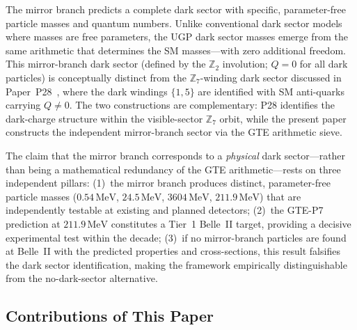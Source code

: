 \documentclass[11pt]{article}
\begin{document}
The mirror branch predicts a complete dark sector with specific, parameter-free particle
masses and quantum numbers. Unlike conventional dark sector models where masses are free
parameters, the UGP dark sector masses emerge from the same arithmetic that determines
the SM masses---with zero additional freedom.
This mirror-branch dark sector (defined by the $\mathbb{Z}_2$ involution; $Q=0$ for all dark particles) is conceptually distinct from the $\mathbb{Z}_7$-winding dark sector discussed in Paper~P28~\cite{SpivackCompUniversality}, where the dark windings $\{1,5\}$ are identified with SM anti-quarks carrying $Q \neq 0$. The two constructions are complementary: P28 identifies the dark-charge structure within the visible-sector $\mathbb{Z}_7$ orbit, while the present paper constructs the independent mirror-branch sector via the GTE arithmetic sieve.

The claim that the mirror branch corresponds to a \emph{physical} dark sector---rather
than being a mathematical redundancy of the GTE arithmetic---rests on three independent
pillars: (1)~the mirror branch produces distinct, parameter-free particle masses
($0.54\,\mathrm{MeV}$, $24.5\,\mathrm{MeV}$, $3604\,\mathrm{MeV}$,
$211.9\,\mathrm{MeV}$) that are independently testable at existing and planned
detectors; (2)~the GTE-P7 prediction at $211.9\,\mathrm{MeV}$ constitutes a Tier~1
Belle~II target, providing a decisive experimental test within the decade; (3)~if
no mirror-branch particles are found at Belle~II with the predicted properties and
cross-sections, this result falsifies the dark sector identification, making the
framework empirically distinguishable from the no-dark-sector alternative.

\subsection{Contributions of This Paper}
\label{ssec:contributions}
\end{document}
